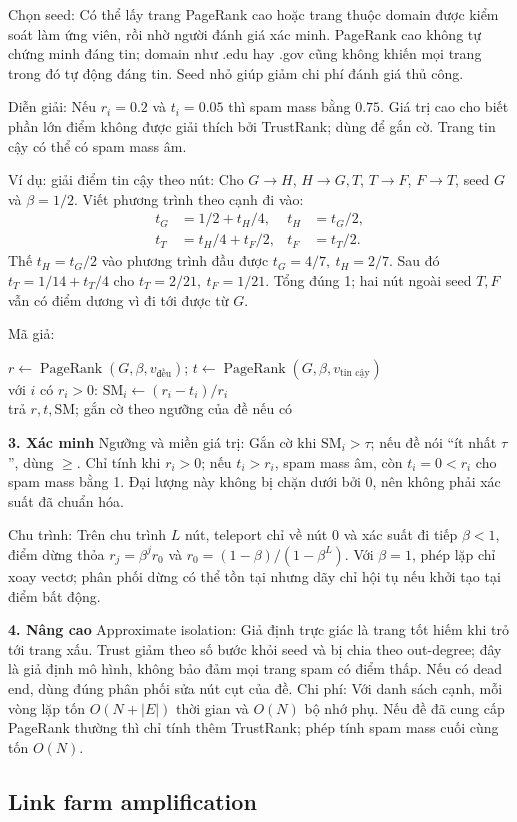 \documentclass[10pt,a4paper,twocolumn]{article}
\makeatletter
\newif\ifexamheadingprinted
\newcommand{\topic}[2]{%
  \global\examheadingprintedfalse\par\subsection{#2}\label{topic:#1}}
\newcommand{\key}[1]{#1:\enspace}
\newcommand{\unitheading}[2]{%
  \par\addvspace{1pt}\noindent\textbf{#1. #2}\enspace}
\newcommand{\unitverification}{\unitheading{3}{Xác minh}}
\newcommand{\unitadvanced}{\unitheading{4}{Nâng cao}}
\newenvironment{algpseudo}{%
  \par\addvspace{2pt}\noindent
  \setlength{\parskip}{0pt}%
  Mã giả:\par\nobreak
  \begin{list}{}{\setlength{\leftmargin}{1em}\setlength{\topsep}{0pt}%
    \setlength{\partopsep}{0pt}\setlength{\parsep}{0pt}%
    \@beginparpenalty=10000\relax}%
  \item\relax
}{\end{list}\par\addvspace{3pt}}
\makeatother
\begin{document}
\key{Chọn seed} Có thể lấy trang PageRank cao hoặc trang thuộc domain được kiểm soát làm ứng viên, rồi nhờ người đánh giá xác minh. PageRank cao không tự chứng minh đáng tin; domain như .edu hay .gov cũng không khiến mọi trang trong đó tự động đáng tin. Seed nhỏ giúp giảm chi phí đánh giá thủ công.

\key{Diễn giải} Nếu $r_i=0.2$ và $t_i=0.05$ thì spam mass bằng $0.75$. Giá trị cao cho biết phần lớn điểm không được giải thích bởi TrustRank; dùng để gắn cờ. Trang tin cậy có thể có spam mass âm.

\key{Ví dụ: giải điểm tin cậy theo nút} Cho $G\to H$, $H\to G,T$, $T\to F$, $F\to T$, seed $G$ và $\beta=1/2$. Viết phương trình theo cạnh đi vào:
\[
\begin{aligned}
t_G&=1/2+t_H/4,& t_H&=t_G/2,\\
t_T&=t_H/4+t_F/2,& t_F&=t_T/2.
\end{aligned}
\]
Thế $t_H=t_G/2$ vào phương trình đầu được $t_G=4/7,\ t_H=2/7$. Sau đó $t_T=1/14+t_T/4$ cho $t_T=2/21,\ t_F=1/21$. Tổng đúng 1; hai nút ngoài seed $T,F$ vẫn có điểm dương vì đi tới được từ $G$.

\begin{algpseudo}
$r\gets\operatorname{PageRank}(G,\beta,v_{\text{đều}})$; $t\gets\operatorname{PageRank}(G,\beta,v_{\text{tin cậy}})$\\
với $i$ có $r_i>0$: $\mathrm{SM}_i\gets(r_i-t_i)/r_i$\\
trả $r,t,\mathrm{SM}$; gắn cờ theo ngưỡng của đề nếu có
\end{algpseudo}

\unitverification
\key{Ngưỡng và miền giá trị} Gắn cờ khi $\mathrm{SM}_i>\tau$; nếu đề nói “ít nhất $\tau$”, dùng $\ge$. Chỉ tính khi $r_i>0$; nếu $t_i>r_i$, spam mass âm, còn $t_i=0<r_i$ cho spam mass bằng 1. Đại lượng này không bị chặn dưới bởi 0, nên không phải xác suất đã chuẩn hóa.

\key{Chu trình} Trên chu trình $L$ nút, teleport chỉ về nút 0 và xác suất đi tiếp $\beta<1$, điểm dừng thỏa $r_j=\beta^jr_0$ và $r_0=(1-\beta)/(1-\beta^L)$. Với $\beta=1$, phép lặp chỉ xoay vectơ; phân phối dừng có thể tồn tại nhưng dãy chỉ hội tụ nếu khởi tạo tại điểm bất động.

\unitadvanced
\key{Approximate isolation} Giả định trực giác là trang tốt hiếm khi trỏ tới trang xấu. Trust giảm theo số bước khỏi seed và bị chia theo out-degree; đây là giả định mô hình, không bảo đảm mọi trang spam có điểm thấp. Nếu có dead end, dùng đúng phân phối sửa nút cụt của đề.
\key{Chi phí} Với danh sách cạnh, mỗi vòng lặp tốn $O(N+|E|)$ thời gian và $O(N)$ bộ nhớ phụ. Nếu đề đã cung cấp PageRank thường thì chỉ tính thêm TrustRank; phép tính spam mass cuối cùng tốn $O(N)$.
\topic{linkfarm}{Link farm amplification}
\end{document}
